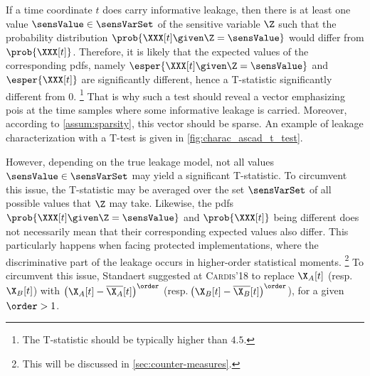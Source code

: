 If a time coordinate \(t\) does carry informative leakage, then there is at least one value \(\sensValue \in \sensVarSet\) of the sensitive variable \(\Z\) such that the probability distribution \(\prob{\XXX[t] \given \Z = \sensValue}\) would differ from \(\prob{\XXX[t]}\).
Therefore, it is likely that the expected values of the corresponding \glspl{pdf}, namely \(\esper{\XXX[t] \given \Z = \sensValue}\) and \(\esper{\XXX[t]}\) are significantly different, hence a T-statistic significantly different from 0.%
\footnote{The T-statistic should be typically higher than \(4.5\).}
That is why such a test should reveal a vector emphasizing \glspl{poi} at the time samples where some informative leakage is carried.
Moreover, according to \autoref{assum:sparsity}, this vector should be \gls{sparse}.
An example of leakage characterization with a T-test is given in \autoref{fig:charac_ascad_t_test}.

However, depending on the true leakage model, not all values \(\sensValue \in \sensVarSet\) may yield a significant T-statistic.
To circumvent this issue, the T-statistic may be averaged over the set \(\sensVarSet\) of all possible values that \(\Z\) may take.
Likewise, the \glspl{pdf} \(\prob{\XXX[t] \given \Z = \sensValue}\) and \(\prob{\XXX[t]}\) being different does not necessarily mean that their corresponding expected values also differ.
This particularly happens when facing protected implementations, where the discriminative part of the leakage occurs in higher-order statistical moments.%
\footnote{
	This will be discussed in \autoref{sec:counter-measures}.
}
To circumvent this issue, Standaert suggested at \textsc{Cardis}'18 to replace \(\X_A[t]\) \Big(resp.\,\(\X_B[t]\)\Big) with \(\left(\X_A[t] - \overline{\X_A}[t]\right)^\order\) \Big(resp.\,\(\left(\X_B[t] - \overline{\X_B}[t]\right)^\order\)\Big), for a given \(\order > 1\).


